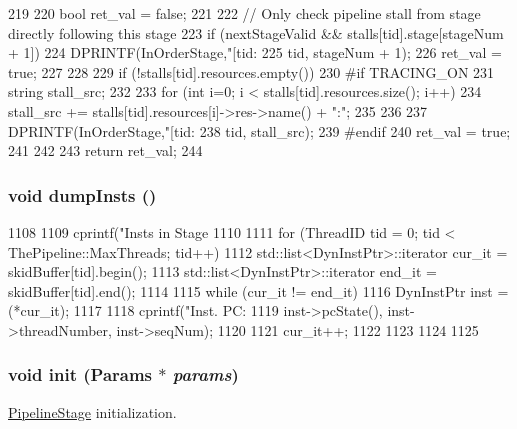 \begin{DoxyCode}
219 {
220     bool ret_val = false;
221 
222     // Only check pipeline stall from stage directly following this stage
223     if (nextStageValid && stalls[tid].stage[stageNum + 1]) {
224         DPRINTF(InOrderStage,"[tid:%
225                 tid, stageNum + 1);
226         ret_val = true;
227     }
228 
229     if (!stalls[tid].resources.empty()) {
230 #if TRACING_ON
231         string stall_src;
232 
233         for (int i=0; i < stalls[tid].resources.size(); i++) {
234             stall_src += stalls[tid].resources[i]->res->name() + ":";
235         }
236 
237         DPRINTF(InOrderStage,"[tid:%
238                 tid, stall_src);
239 #endif
240         ret_val = true;
241     }
242 
243     return ret_val;
244 }
\end{DoxyCode}
\hypertarget{classPipelineStage_a80587b4fe043bbe1995536cb3b361588}{
\subsubsection[{dumpInsts}]{\setlength{\rightskip}{0pt plus 5cm}void dumpInsts ()}}
\label{classPipelineStage_a80587b4fe043bbe1995536cb3b361588}



\begin{DoxyCode}
1108 {
1109     cprintf("Insts in Stage %
1110 
1111     for (ThreadID tid = 0; tid < ThePipeline::MaxThreads; tid++) {
1112         std::list<DynInstPtr>::iterator cur_it =  skidBuffer[tid].begin();
1113         std::list<DynInstPtr>::iterator end_it =  skidBuffer[tid].end();
1114 
1115         while (cur_it != end_it) {
1116             DynInstPtr inst = (*cur_it);
1117 
1118             cprintf("Inst. PC:%
1119                     inst->pcState(), inst->threadNumber, inst->seqNum);
1120 
1121             cur_it++;
1122         }
1123     }
1124 
1125 }
\end{DoxyCode}
\hypertarget{classPipelineStage_a66db401ca5ea7de9fe7ca057d5eeb53c}{
\subsubsection[{init}]{\setlength{\rightskip}{0pt plus 5cm}void init ({\bf Params} $\ast$ {\em params})}}
\label{classPipelineStage_a66db401ca5ea7de9fe7ca057d5eeb53c}
\hyperlink{classPipelineStage}{PipelineStage} initialization. 


